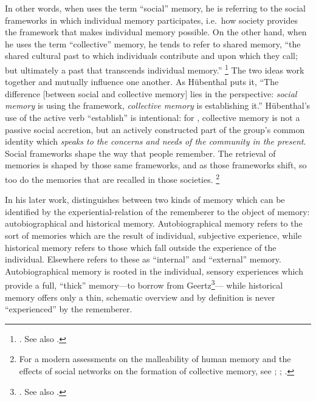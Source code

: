 In other words, when \halbwachs uses the term ``social'' memory, he is referring to the social frameworks in which individual memory participates, i.e.~how society provides the framework that makes individual memory possible.\autocite[180]{hubenthal_carstens-hasselbalch2012} On the other hand, when he uses the term ``collective'' memory, he tends to refer to shared memory, ``the shared cultural past to which individuals contribute and upon which they call; but ultimately a past that transcends individual memory.''%
%
\footnote{\cite[360]{keith_ec2015}. See also \cite[180]{hubenthal_carstens-hasselbalch2012}.}
%
The two ideas work together and mutually influence one another. As Hübenthal puts it, ``The difference [between social and collective memory] lies in the perspective: \emph{social memory} is using the framework, \emph{collective memory} is establishing it.''\autocite[180.]{hubenthal_carstens-hasselbalch2012} Hübenthal's use of the active verb ``establish'' is intentional: for \halbwachs, collective memory is not a passive social accretion, but an actively constructed part of the group's common identity which \emph{speaks to the concerns and needs of the community in the present}. Social frameworks shape the way that people remember. The retrieval of memories is shaped by those same frameworks, and as those frameworks shift, so too do the memories that are recalled in those societies.%
%
\footnote{For a modern assessments on the malleability of human memory and the effects of social networks on the formation of collective memory, see \cite{coman-etal_pnas2016}; \cite{yamashiro-hirst_jarmc2014}; \cite{coman-etal_yang-etal2012}.}
%

In his later work, \halbwachs distinguishes between two kinds of memory which can be identified by the experiential-relation of the rememberer to the object of memory: autobiographical and historical memory.\autocite[52]{halbwachs1980} Autobiographical memory refers to the sort of memories which are the result of individual, subjective experience, while historical memory refers to those which fall outside the experience of the individual. Elsewhere \halbwachs refers to these as ``internal'' and ``external'' memory. Autobiographical memory is rooted in the individual, sensory experiences which provide a full, ``thick'' memory---to borrow from Geertz\footnote{\cite[3--30]{geertz1973}. See also \cite[189--192]{smith-riley2009}.}--- while historical memory offers only a thin, schematic overview and by definition is never ``experienced'' by the rememberer.  

